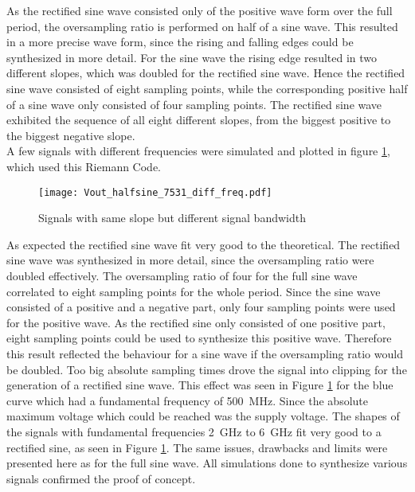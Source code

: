 As the rectified sine wave consisted only of the positive wave form over the full period, the oversampling ratio is performed on half of a sine wave.
This resulted in a more precise wave form, since the rising and falling edges could be synthesized in more detail.
For the sine wave the rising edge resulted in two different slopes, which was doubled for the rectified sine wave.
Hence the rectified sine wave consisted of eight sampling points, while the corresponding positive half of a sine wave only consisted of four sampling points.
The rectified sine wave exhibited the sequence of all eight different slopes, from the biggest positive to the biggest negative slope.\\
A few signals with different frequencies were simulated and plotted in figure \ref{fig:DiffSigBWSameSlope}, which used this Riemann Code.

\begin{figure}[htb!]
	\centering
  \texttt{[image: Vout\_halfsine\_7531\_diff\_freq.pdf]}
	\caption{Signals with same slope but different signal bandwidth}
	\label{fig:DiffSigBWSameSlope}
\end{figure}

As expected the rectified sine wave fit very good to the theoretical.
The rectified sine wave was synthesized in more detail, since the oversampling ratio were doubled effectively.
The oversampling ratio of four for the full sine wave correlated to eight sampling points for the whole period.
Since the sine wave consisted of a positive and a negative part, only four sampling points were used for the positive wave.
As the rectified sine only consisted of one positive part, eight sampling points could be used to synthesize this positive wave.
Therefore this result reflected the behaviour for a sine wave if the oversampling ratio would be doubled.
Too big absolute sampling times drove the signal into clipping for the generation of a rectified sine wave.
This effect was seen in Figure \ref{fig:DiffSigBWSameSlope} for the blue curve which had a fundamental frequency of \SI{500}{\mega \hertz}.
Since the absolute maximum voltage which could be reached was the supply voltage.
The shapes of the signals with fundamental frequencies \SI{2}{\giga \hertz} to \SI{6}{\giga \hertz} fit very good to a rectified sine, as seen in Figure \ref{fig:DiffSigBWSameSlope}.
The same issues, drawbacks and limits were presented here as for the full sine wave.
All simulations done to synthesize various signals confirmed the proof of concept.



